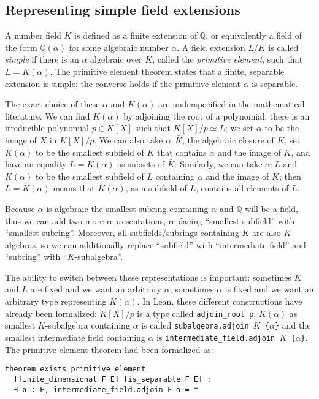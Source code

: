 \documentclass{lipics-v2021}
\newcommand{\lean}[1]{\texttt{#1}\xspace} %
\newcommand{\Q}{\mathbb{Q}}
\begin{document}
\subsection{Representing simple field extensions}

A number field $K$ is defined as a finite extension of $\Q$, or equivalently a field of the form $\Q(\alpha)$ for some algebraic number $\alpha$.
A field extension $L / K$ is called \emph{simple} if there is an $\alpha$ algebraic over $K$, called the \emph{primitive element}, such that $L = K(\alpha)$.
The primitive element theorem states that a finite, separable extension is simple; the converse holds if the primitive element $\alpha$ is separable.

The exact choice of these $\alpha$ and $K(\alpha)$ are underspecified in the mathematical literature.
We can find $K(\alpha)$ by adjoining the root of a polynomial: there is an irreducible polynomial $p \in K[X]$ such that $K[X] / p \simeq L$; we set $\alpha$ to be the image of $X$ in $K[X] / p$.
We can also take $\alpha : \bar{K}$, the algebraic closure of $K$, set $K(\alpha)$ to be the smallest subfield of $\bar{K}$ that contains $\alpha$ and the image of $K$, and have an equality $L = K(\alpha)$ as subsets of $\bar{K}$.
Similarly, we can take $\alpha : L$ and $K(\alpha)$ to be the smallest subfield of $L$ containing $\alpha$ and the image of $K$; then $L = K(\alpha)$ means that $K(\alpha)$, as a subfield of $L$, contains all elements of $L$.

Because $\alpha$ is algebraic the smallest subring containing $\alpha$ and $\Q$ will be a field, thus we can add two more representations, replacing ``smallest subfield'' with ``smallest subring''.
Moreover, all subfields/subrings containing $K$ are also $K$-algebras, so we can additionally replace ``subfield'' with ``intermediate field'' and ``subring'' with ``$K$-subalgebra''.

The ability to switch between these representations is important: sometimes $K$ and $L$ are fixed and we want an arbitrary $\alpha$; sometimes $\alpha$ is fixed and we want an arbitrary type representing $K(\alpha)$.
In Lean, these different constructions have already been formalized:
$K[X] / p$ is a type called \lean{adjoin\_root p},
$K(\alpha)$ as smallest $K$-subalgebra containing $\alpha$ is called \lean{subalgebra.adjoin $K$ \{$\alpha$\}}
and the smallest intermediate field containing $\alpha$ is \lean{intermediate\-\_field.adjoin $K$ \{$\alpha$\}}.
The primitive element theorem had been formalized as:
\begin{lstlisting}
theorem exists_primitive_element
  [finite_dimensional F E] [is_separable F E] :
  ∃ α : E, intermediate_field.adjoin F α = ⊤
\end{lstlisting}
\end{document}

